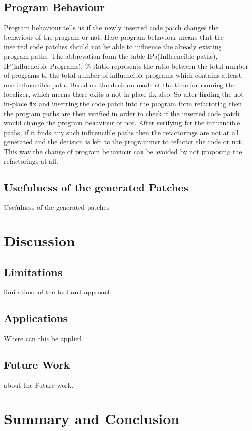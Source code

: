 \section{Program Behaviour}
Program behaviour tells us if the newly inserted code patch changes the
behaviour of the program or not. Here program behaviour means
that the inserted code patches should not be able to influence the
already existing program paths. The abbrevation form the table
IPa(Influencible paths), IP(Influencible Programs), \% Ratio represents
the ratio between the total number of programs to the total number of
influencible programs which contains atleast one influencible path.
Based on the decision made at the time for running the localizer,
which means there exits a not-in-place fix also. So after finding the 
not-in-place fix and inserting the code patch into the program form
refactoring then the program paths are then verified in order 
to check if the inserted code patch would change the program behaviour
or not. After verifying for the influencible paths, if it finds any such
influencible paths then the refactorings are not at all generated and
the decision is left to the programmer to refactor the code 
or not. This way the change of program behaviour can be avoided by not
proposing the refactorings at all.


\section{Usefulness of the generated Patches}
Usefulness of the generated patches.

\chapter{Discussion}
\label{chapter:Discussion}

\section{Limitations}
limitations of the tool and approach.

\section{Applications}
Where can this be applied.

\section{Future Work}
about the Future work.

\chapter{Summary and Conclusion}
\label{chapter:Conclusion}